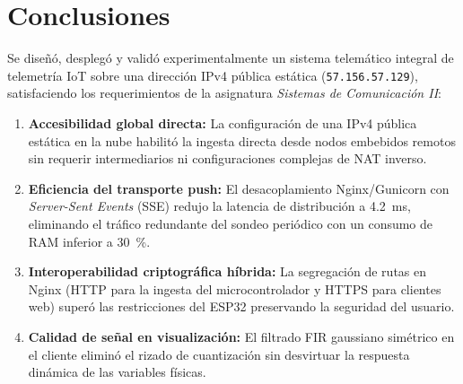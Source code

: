 \documentclass[conference]{IEEEtran}
\begin{document}
\section{Conclusiones}
Se diseñó, desplegó y validó experimentalmente un sistema telemático integral de telemetría IoT sobre una dirección IPv4 pública estática (\texttt{57.156.57.129}), satisfaciendo los requerimientos de la asignatura \textit{Sistemas de Comunicación II}:
\begin{enumerate}
    \item \textbf{Accesibilidad global directa:} La configuración de una IPv4 pública estática en la nube habilitó la ingesta directa desde nodos embebidos remotos sin requerir intermediarios ni configuraciones complejas de NAT inverso.
    \item \textbf{Eficiencia del transporte push:} El desacoplamiento Nginx/Gunicorn con \textit{Server-Sent Events} (SSE) redujo la latencia de distribución a \SI{4.2}{\milli\second}, eliminando el tráfico redundante del sondeo periódico con un consumo de RAM inferior a \SI{30}{\percent}.
    \item \textbf{Interoperabilidad criptográfica híbrida:} La segregación de rutas en Nginx (HTTP para la ingesta del microcontrolador y HTTPS para clientes web) superó las restricciones del ESP32 preservando la seguridad del usuario.
    \item \textbf{Calidad de señal en visualización:} El filtrado FIR gaussiano simétrico en el cliente eliminó el rizado de cuantización sin desvirtuar la respuesta dinámica de las variables físicas.
\end{enumerate}

\newpage
\renewcommand{\refname}{Referencias Bibliográficas}


\end{document}
